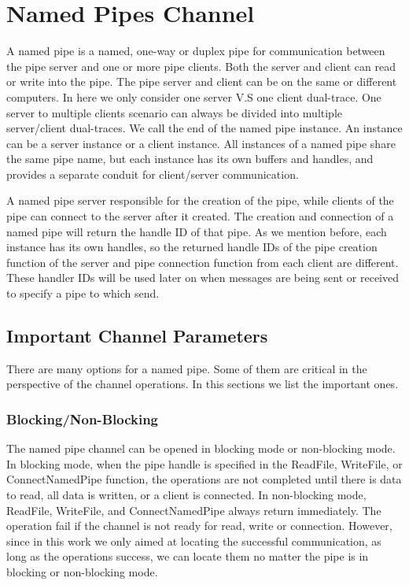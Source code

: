 \section{Named Pipes Channel}
A named pipe is a named, one-way or duplex pipe for communication between the pipe server and one or more pipe clients. Both the server and client can read or write into the pipe. The pipe server and client can be on the same or different computers.  In here we only consider one server V.S one client dual-trace. One server to multiple clients scenario can always be divided into multiple server/client dual-traces. We call the end of the named pipe instance. An instance can be a server instance or a client instance. All instances of a named pipe share the same pipe name, but each instance has its own buffers and handles, and provides a separate conduit for client/server communication. 

A named pipe server responsible for the creation of the pipe, while clients of the pipe can connect to the server after it created. The creation and connection of a named pipe will return the handle ID of that pipe. As we mention before, each instance has its own handles, so the returned handle IDs of the pipe creation function of the server and pipe connection function from each client are different. These handler IDs will be used later on when messages are being sent or received to specify a pipe to which send.

\subsection{Important Channel Parameters}
There are many options for a named pipe. Some of them are critical in the perspective of the channel operations. In this sections we list the important ones.

\subsubsection{Blocking/Non-Blocking}
The named pipe channel can be opened in blocking mode or non-blocking mode. In blocking mode, when the pipe handle is specified in the ReadFile, WriteFile, or ConnectNamedPipe function, the operations are not completed until there is data to read, all data is written, or a client is connected. In non-blocking mode, ReadFile, WriteFile, and ConnectNamedPipe always return immediately. The operation fail if the channel is not ready for read, write or connection. However, since in this work we only aimed at locating the successful communication, as long as the operations success, we can locate them no matter the pipe is in blocking or non-blocking mode.

